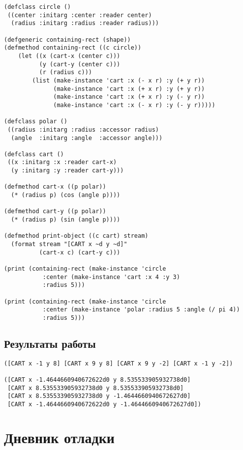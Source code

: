 \documentclass[15pt]{extarticle}
\begin{document}
\begin{lstlisting}
(defclass circle ()
 ((center :initarg :center :reader center)
  (radius :initarg :radius :reader radius)))

(defgeneric containing-rect (shape))
(defmethod containing-rect ((c circle))
    (let ((x (cart-x (center c)))
          (y (cart-y (center c)))
          (r (radius c)))
        (list (make-instance 'cart :x (- x r) :y (+ y r))
              (make-instance 'cart :x (+ x r) :y (+ y r))
              (make-instance 'cart :x (+ x r) :y (- y r))
              (make-instance 'cart :x (- x r) :y (- y r)))))

(defclass polar ()
 ((radius :initarg :radius :accessor radius)
  (angle  :initarg :angle  :accessor angle)))

(defclass cart ()
 ((x :initarg :x :reader cart-x)
  (y :initarg :y :reader cart-y)))

(defmethod cart-x ((p polar))
  (* (radius p) (cos (angle p))))

(defmethod cart-y ((p polar))
  (* (radius p) (sin (angle p))))

(defmethod print-object ((c cart) stream)
  (format stream "[CART x ~d y ~d]"
          (cart-x c) (cart-y c)))

(print (containing-rect (make-instance 'circle
           :center (make-instance 'cart :x 4 :y 3)
           :radius 5)))

(print (containing-rect (make-instance 'circle
           :center (make-instance 'polar :radius 5 :angle (/ pi 4))
           :radius 5)))
\end{lstlisting}

\subsection{Результаты работы}

\begin{lstlisting}
([CART x -1 y 8] [CART x 9 y 8] [CART x 9 y -2] [CART x -1 y -2]) 

([CART x -1.4644660940672622d0 y 8.535533905932738d0]
 [CART x 8.535533905932738d0 y 8.535533905932738d0]
 [CART x 8.535533905932738d0 y -1.4644660940672627d0]
 [CART x -1.4644660940672622d0 y -1.4644660940672627d0])
\end{lstlisting}

\section{Дневник отладки}
\end{document}

